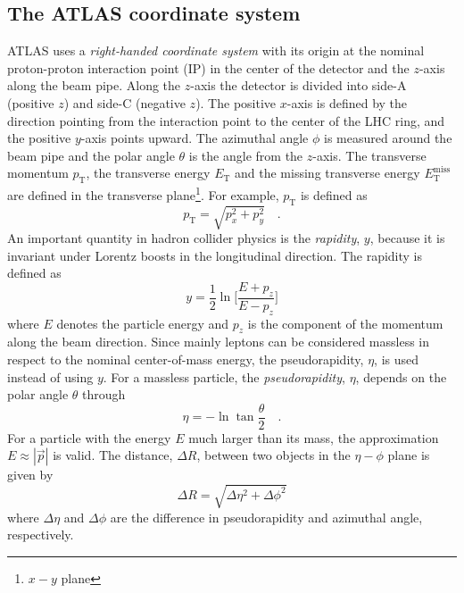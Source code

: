 \subsection{The ATLAS coordinate system}
\label{subsec:ae_atlas_coordinate}
ATLAS uses a \textit{right-handed coordinate system} with its origin at the nominal proton-proton interaction point (IP) in the center of the detector and the $z$-axis along the beam pipe.
Along the $z$-axis the detector is divided into side-A (positive $z$) and side-C (negative $z$).
The positive $x$-axis is defined by the direction pointing from the interaction point to the center of the LHC ring, and the positive $y$-axis points upward.%
The azimuthal angle $\phi$ is measured around the beam pipe  and the polar angle $\theta$ is the angle from the $z$-axis.
The transverse momentum $p_{\mathrm{T}}$, the transverse energy $E_{\mathrm{T}}$ and the missing transverse
energy $E_{\mathrm{T}}^{\mathrm{miss}}$ are defined in the transverse plane\footnote{$x-y$ plane}.
For example, $p_{\mathrm{T}}$ is defined as
%
\begin{equation}
    p_{\mathrm{T}}= \sqrt{p_{x}^{2} + p_{y}^{2}} \quad .
\end{equation}
%
An important quantity in hadron collider physics is the \textit{rapidity}, $y$, because it is invariant under Lorentz boosts in the longitudinal direction.
The rapidity is defined as
%
\begin{equation}
    y = \frac{1}{2} \ln\Big[\frac{E + p_{z}}{E - p_{z}}\Big]
\end{equation}
%
where $E$ denotes the particle energy and $p_{z}$  is the component of the momentum along the beam direction.
Since mainly leptons can be considered massless in respect to the nominal center-of-mass energy, the pseudorapidity, $\eta$, is used instead of using $y$.
For a massless particle, the \textit{pseudorapidity}, $\eta$, depends on the polar angle $\theta$ through
%
\begin{equation}
    \eta = - \ln \tan \frac{\theta}{2} \quad .
\end{equation}
%
For a particle with the energy $E$ much larger than its mass, the approximation $E \approx |\vec{p}|$ is valid.
The distance, $\Delta R$, between two objects in the $\eta-\phi$ plane is given by
%
\begin{equation}
    \Delta R = \sqrt{\Delta \eta^{2} + \Delta \phi^{2}}
\end{equation}
%
where $\Delta \eta$ and $\Delta \phi$ are the difference in pseudorapidity and azimuthal angle, respectively.

